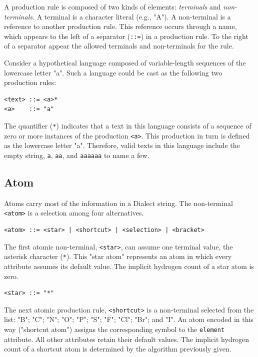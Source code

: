 \documentclass{article}
\def\ttt{\texttt}
\begin{document}
A production rule is composed of two kinds of elements: \textit{terminals} and \textit{non-terminals}. A terminal is a character literal (e.g., "A"). A non-terminal is a reference to another production rule. This reference occurs through a name, which appears to the left of a separator (\ttt{::=}) in a production rule. To the right of a separator appear the allowed terminals and non-terminals for the rule.

Consider a hypothetical language composed of variable-length sequences of the lowercase letter "a". Such a language could be cast as the following two production rules:

\begin{lstlisting}
<text> ::= <a>*
<a>    ::= "a"
\end{lstlisting}

The quantifier (\ttt{*}) indicates that a text in this language consists of a sequence of zero or more instances of the production \ttt{<a>}. This production in turn is defined as the lowercase letter "a". Therefore, valid texts in this language include the empty string, \ttt{a}, \ttt{aa}, and \ttt{aaaaaa} to name a few.

\subsection*{Atom}

Atoms carry most of the information in a Dialect string. The non-terminal \ttt{<atom>} is a selection among four alternatives.

\begin{lstlisting}
<atom> ::= <star> | <shortcut> | <selection> | <bracket>
\end{lstlisting}

The first atomic non-terminal, \ttt{<star>}, can assume one terminal value, the asterisk character (\ttt{*}). This "star atom" represents an atom in which every attribute assumes its default value. The implicit hydrogen count of a star atom is zero.

\begin{lstlisting}
<star> ::= "*"
\end{lstlisting}

The next atomic production rule, \ttt{<shortcut>} is a non-terminal selected from the list: "B"; "C"; "N"; "O"; "P"; "S"; "F"; "Cl"; "Br"; and "I". An atom encoded in this way ("shortcut atom") assigns the corresponding symbol to the \ttt{element} attribute. All other attributes retain their default values. The implicit hydrogen count of a shortcut atom is determined by the algorithm previously given.
\end{document}
